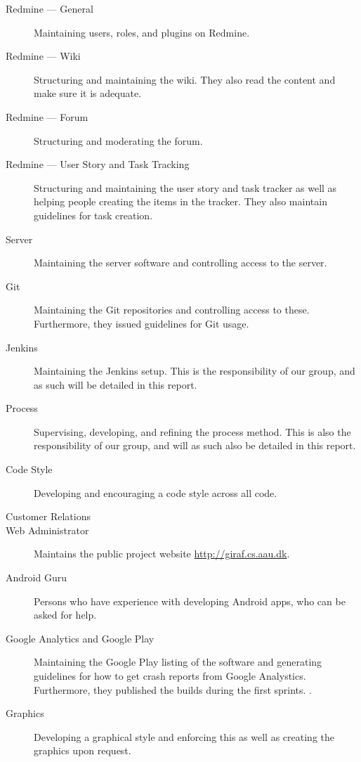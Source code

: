 \begin{description}
  \item[Redmine --- General] Maintaining users, roles, and plugins on Redmine.
  \item[Redmine --- Wiki] Structuring and maintaining the wiki. They also read the content and make sure it is adequate.
  \item[Redmine --- Forum] Structuring and moderating the forum.
  \item[Redmine --- User Story and Task Tracking] Structuring and maintaining the user story and task tracker as well as helping people creating the items in the tracker. They also maintain guidelines for task creation.
  \item[Server] Maintaining the server software and controlling access to the server.
  \item[Git] Maintaining the Git repositories and controlling access to these. Furthermore, they issued guidelines for Git usage.
  \item[Jenkins] Maintaining the Jenkins setup. This is the responsibility of our group, and as such will be detailed in this report.
  \item[Process] Supervising, developing, and refining the process method. This is also the responsibility of our group, and will as such also be detailed in this report.
  \item[Code Style] Developing and encouraging a code style across all code.
  \item[Customer Relations] 
  \item[Web Administrator] Maintains the public project website \url{http://giraf.cs.aau.dk}.
  \item[Android Guru] Persons who have experience with developing Android apps, who can be asked for help.
  \item[Google Analytics and Google Play] Maintaining the Google Play listing of the software and generating guidelines for how to get crash reports from Google Analystics. Furthermore, they published the builds during the first sprints. .
  \item[Graphics] Developing a graphical style and enforcing this as well as creating the graphics upon request.
\end{description}